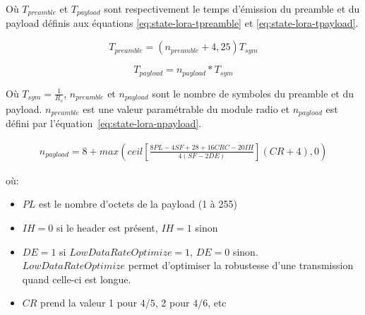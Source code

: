 Où $T_{preamble}$ et $T_{payload}$ sont respectivement le temps d'émission du preamble et du payload définis aux équations \ref{eq:state-lora-tpreamble} et \ref{eq:state-lora-tpayload}.

\begin{equation}\label{eq:state-lora-tpreamble}
    T_{preamble} = (n_{preamble} + 4,25)T_{sym}
\end{equation}

\begin{equation}\label{eq:state-lora-tpayload}
    T_{payload} = n_{payload} * T_{sym}
\end{equation}

Où $T_{sym} = \frac{1}{R_s}$, $n_{preamble}$ et $n_{payload}$ sont le nombre de symboles du preamble et du payload. $n_{preamble}$ est une valeur paramétrable du module radio et $n_{payload}$ est défini par l'équation~\ref{eq:state-lora-npayload}.

\begin{equation}\label{eq:state-lora-npayload}
    \begin{split}
    n_{payload} =8 +max
     \left( ceil \left[ \frac{8PL - 4SF + 28 + 16CRC - 20IH}{4(SF-2DE)} \right] (CR+4), 0 \right)
    \end{split}
\end{equation}

où:
\begin{itemize}
    \item $PL$ est le nombre d'octets de la payload (1 à 255)
    \item $IH=0$ si le header est présent, $IH=1$ sinon
    \item $DE=1$ si $LowDataRateOptimize=1$, $DE=0$ sinon.\\
    $LowDataRateOptimize$ permet d'optimiser la robustesse d'une transmission quand celle-ci est longue.
    \item $CR$ prend la valeur 1 pour $4/5$, 2 pour $4/6$, etc
\end{itemize}
